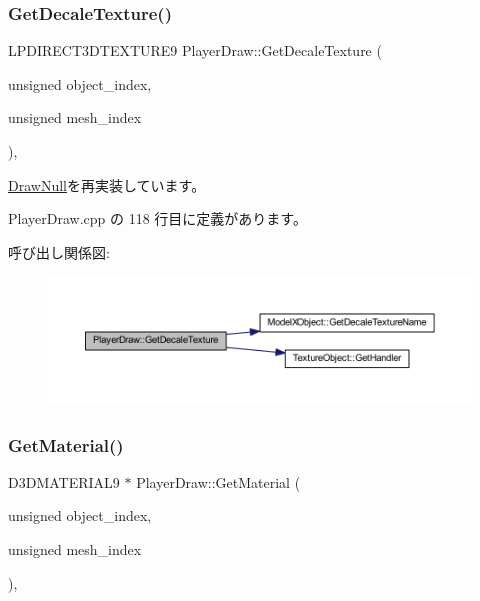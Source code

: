 \subsubsection{\texorpdfstring{Get\+Decale\+Texture()}{GetDecaleTexture()}}
{\footnotesize\ttfamily L\+P\+D\+I\+R\+E\+C\+T3\+D\+T\+E\+X\+T\+U\+R\+E9 Player\+Draw\+::\+Get\+Decale\+Texture (\begin{DoxyParamCaption}\item[{unsigned}]{object\+\_\+index,  }\item[{unsigned}]{mesh\+\_\+index }\end{DoxyParamCaption})\hspace{0.3cm}{\ttfamily [override]}, {\ttfamily [virtual]}}



\mbox{\hyperlink{class_draw_null_a8496ed1b1f765a331a8f1704122b8ca4}{Draw\+Null}}を再実装しています。



 Player\+Draw.\+cpp の 118 行目に定義があります。

呼び出し関係図\+:\nopagebreak
\begin{figure}[H]
\begin{center}
\leavevmode
\includegraphics[width=350pt]{class_player_draw_a6cecfb28942044efff0b9d6213b511a5_cgraph}
\end{center}
\end{figure}
\mbox{\label{class_player_draw_ae818d3adaf5120845c2a78c230b5365e}} 
\subsubsection{\texorpdfstring{Get\+Material()}{GetMaterial()}}
{\footnotesize\ttfamily D3\+D\+M\+A\+T\+E\+R\+I\+A\+L9 $\ast$ Player\+Draw\+::\+Get\+Material (\begin{DoxyParamCaption}\item[{unsigned}]{object\+\_\+index,  }\item[{unsigned}]{mesh\+\_\+index }\end{DoxyParamCaption})\hspace{0.3cm}{\ttfamily [override]}, {\ttfamily [virtual]}}



